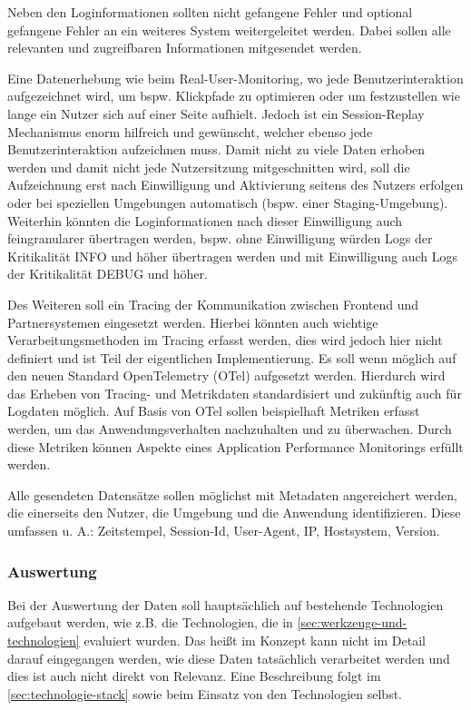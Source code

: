 	Neben den Loginformationen sollten nicht gefangene Fehler und optional gefangene Fehler an ein weiteres System weitergeleitet werden. Dabei sollen alle relevanten und zugreifbaren Informationen mitgesendet werden.
		
	Eine Datenerhebung wie beim Real-User-Monitoring, wo jede Benutzerinteraktion aufgezeichnet wird, um bspw. Klickpfade zu optimieren oder um festzustellen wie lange ein Nutzer sich auf einer Seite aufhielt. Jedoch ist ein Session-Replay Mechanismus enorm hilfreich und gewünscht, welcher ebenso jede Benutzerinteraktion aufzeichnen muss. Damit nicht zu viele Daten erhoben werden und damit nicht jede Nutzersitzung mitgeschnitten wird, soll die Aufzeichnung erst nach Einwilligung und Aktivierung seitens des Nutzers erfolgen oder bei speziellen Umgebungen automatisch (bspw. einer Staging-Umgebung). Weiterhin könnten die Loginformationen nach dieser Einwilligung auch feingranularer übertragen werden, bspw. ohne Einwilligung würden Logs der Kritikalität INFO und höher übertragen werden und mit Einwilligung auch Logs der Kritikalität DEBUG und höher.
		
	Des Weiteren soll ein Tracing der Kommunikation zwischen Frontend und Partnersystemen eingesetzt werden. Hierbei könnten auch wichtige Verarbeitungsmethoden im Tracing erfasst werden, dies wird jedoch hier nicht definiert und ist Teil der eigentlichen Implementierung. Es soll wenn möglich auf den neuen Standard OpenTelemetry (OTel) aufgesetzt werden. Hierdurch wird das Erheben von Tracing- und Metrikdaten standardisiert und zukünftig auch für Logdaten möglich. Auf Basis von OTel sollen beispielhaft Metriken erfasst werden, um das Anwendungsverhalten nachzuhalten und zu überwachen. Durch diese Metriken können Aspekte eines Application Performance Monitorings erfüllt werden.
		
	Alle gesendeten Datensätze sollen möglichst mit Metadaten angereichert werden, die einerseits den Nutzer, die Umgebung und die Anwendung identifizieren. Diese umfassen u. A.: Zeitstempel, Session-Id, User-Agent, IP, Hostsystem, Version.
		
	\subsubsection{Auswertung}
		
	Bei der Auswertung der Daten soll hauptsächlich auf bestehende Technologien aufgebaut werden, wie z.B. die Technologien, die in \autoref{sec:werkzeuge-und-technologien} evaluiert wurden. Das heißt im Konzept kann nicht im Detail darauf eingegangen werden, wie diese Daten tatsächlich verarbeitet werden und dies ist auch nicht direkt von Relevanz. Eine Beschreibung folgt im \autoref{sec:technologie-stack} sowie beim Einsatz von den Technologien selbst.
		
